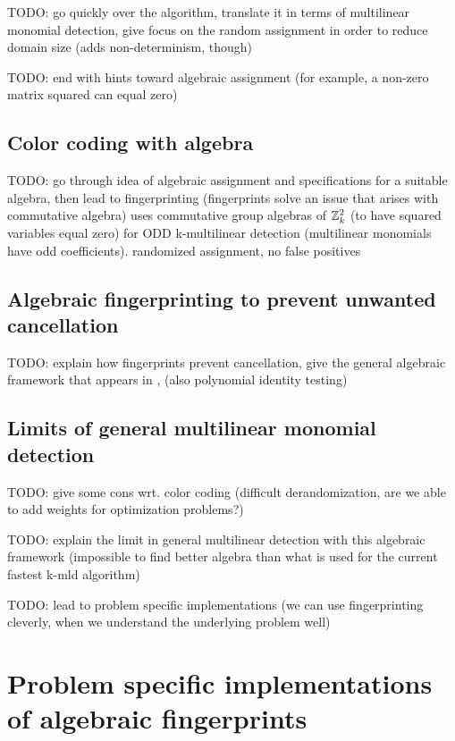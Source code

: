TODO: go quickly over the algorithm, translate it in terms of multilinear monomial detection, 
give focus on the random assignment in order to reduce domain size (adds non-determinism, though)

TODO: end with hints toward algebraic assignment (for example, a non-zero matrix squared can equal zero)

\subsection{Color coding with algebra}

TODO: go through idea of algebraic assignment and specifications for a suitable algebra, 
then lead to fingerprinting (fingerprints solve an issue that arises with commutative algebra)
\cite{Koutis08} uses commutative group algebras of $\mathbb Z^{2}_{k}$ (to have squared variables equal zero) 
for ODD k-multilinear detection (multilinear monomials have odd coefficients). randomized assignment, no false positives



\subsection{Algebraic fingerprinting to prevent unwanted cancellation}

TODO: explain how fingerprints prevent cancellation, 
give the general algebraic framework that appears in \cite{Williams09}, 
(also polynomial identity testing)

\subsection{Limits of general multilinear monomial detection}

TODO: give some cons wrt. color coding (difficult derandomization, 
are we able to add weights for optimization problems?) %

TODO: explain the limit in general multilinear detection with this algebraic framework 
(impossible to find better algebra than what is used for the current fastest k-mld algorithm)

TODO: lead to problem specific implementations 
(we can use fingerprinting cleverly, when we understand the underlying problem well)

\section{Problem specific implementations of algebraic fingerprints}


